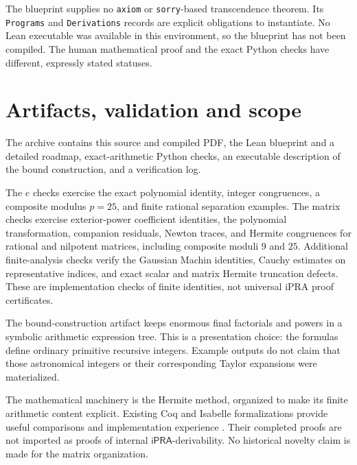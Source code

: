 \documentclass[11pt]{article}
\theoremstyle{definition}
\newcommand{\ipra}{\mathsf{iPRA}}
\begin{document}
The blueprint supplies no \texttt{axiom} or \texttt{sorry}-based
transcendence theorem. Its \texttt{Programs} and \texttt{Derivations}
records are explicit obligations to instantiate.
No Lean executable was available in this environment, so the blueprint
has not been compiled. The human mathematical proof and the exact Python
checks have different, expressly stated statuses.

\section{Artifacts, validation and scope}

The archive contains this source and compiled PDF, the Lean blueprint and
a detailed roadmap, exact-arithmetic Python checks, an executable
description of the bound construction, and a verification log.

The \(e\) checks exercise the exact polynomial identity, integer
congruences, a composite modulus \(p=25\), and finite rational separation
examples. The matrix checks exercise exterior-power coefficient
identities, the polynomial transformation, companion residuals,
Newton traces, and Hermite congruences for rational and nilpotent matrices,
including composite moduli \(9\) and \(25\).
Additional finite-analysis checks verify the Gaussian Machin identities,
Cauchy estimates on representative indices, and exact scalar and matrix
Hermite truncation defects. These are implementation checks of finite
identities, not universal iPRA proof certificates.

The bound-construction artifact keeps enormous final factorials and
powers in a symbolic arithmetic expression tree. This is a presentation
choice: the formulas define ordinary primitive recursive integers.
Example outputs do not claim that those astronomical integers or their
corresponding Taylor expansions were materialized.

The mathematical machinery is the Hermite method, organized to make
its finite arithmetic content explicit. Existing Coq and Isabelle
formalizations provide useful comparisons and implementation experience
\cite{bernard,eberl}. Their completed proofs are not imported as proofs
of internal \(\ipra\)-derivability. No historical novelty claim is made
for the matrix organization.
\end{document}
